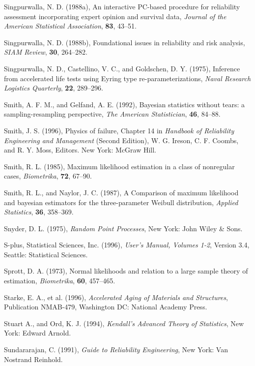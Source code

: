 \begin{thebibliography}{999}
Singpurwalla, N. D. (1988a), An interactive PC-based procedure for
reliability assessment incorporating expert opinion and survival data,
{\em Journal of the American Statistical Association}, {\bf 83}, 43--51.

Singpurwalla, N. D. (1988b), Foundational issues in reliability and
risk analysis, {\em SIAM Review}, {\bf 30}, 264--282.

Singpurwalla, N. D., Castellino, V. C., and Goldschen, D. Y. (1975),
Inference from accelerated life tests using Eyring type
re-parameterizations,  {\em Naval Research Logistics Quarterly}, {\bf
22}, 289--296.

Smith, A. F. M.,  and Gelfand, A. E. (1992), Bayesian statistics
without tears: a sampling-resampling perspective, {\em The American
Statistician}, {\bf 46}, 84--88.

Smith, J. S. (1996), Physics of failure, Chapter 14 in {\em Handbook
of Reliability Engineering and Management} (Second Edition), W. G.
Ireson, C. F. Coombs, and R. Y.  Moss, Editors.  New York: McGraw Hill.

Smith, R. L. (1985), Maximum likelihood estimation in a class of
nonregular cases, {\em Biometrika}, {\bf 72}, 67--90.

Smith, R. L., and Naylor, J. C. (1987),
A Comparison of maximum likelihood and bayesian estimators for the
three-parameter Weibull distribution,
{\em Applied Statistics}, {\bf 36}, 358--369.

Snyder, D. L. (1975), {\em Random Point Processes}, New York: John
Wiley \& Sons.

S-plus, Statistical Sciences, Inc. (1996), {\em \splus User's Manual,
Volumes 1-2}, Version 3.4, Seattle: Statistical Sciences.

Sprott, D. A. (1973), Normal likelihoods and relation to a large
sample theory of estimation, {\em Biometrika}, {\bf 60}, 457--465.

Starke, E. A., et al. (1996), {\em Accelerated Aging of Materials and
Structures}, Publication NMAB-479, Washington DC: National Academy Press.

Stuart A., and Ord, K. J. (1994), {\em Kendall's Advanced Theory of
Statistics}, New York: Edward Arnold.

Sundararajan, C. (1991), {\em Guide to Reliability Engineering}, New
York: Van Nostrand Reinhold.


\end{thebibliography}
